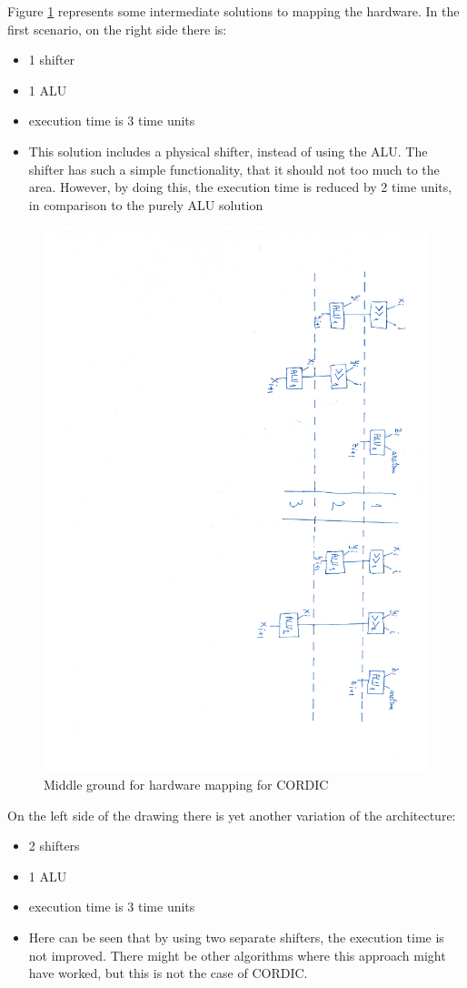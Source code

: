 \documentclass[12pt, a4paper,oneside]{article}
\begin{document}
Figure \ref{fig:schedules_1} represents some intermediate solutions to mapping
the hardware. In the first scenario, on the right side there is:

\begin{itemize}
	\item 1 shifter
	\item 1 ALU
	\item execution time is 3 time units
	\item This solution includes a physical shifter, instead of using the
	ALU. The shifter has such a simple functionality, that it should not too
	much to the area. However, by doing this, the execution time is reduced by 2
	time units, in comparison to the purely ALU solution
\end{itemize}

\begin{figure}[H]
	\centering
	\includegraphics[height = \textwidth,angle=91, trim=11.5cm 3.5cm 1.5cm 3.5cm, clip]{schedules_1.pdf}
	\caption{Middle ground for hardware mapping for CORDIC}
	\label{fig:schedules_1}
\end{figure}

On the left side of the drawing there is yet another variation of the architecture:

\begin{itemize}
	\item 2 shifters
	\item 1 ALU
	\item execution time is 3 time units
	\item Here can be seen that by using two separate shifters, the execution time
	is not improved. There might be other algorithms where this approach might have worked,
	but this is not the case of CORDIC.
\end{itemize}
\end{document}
